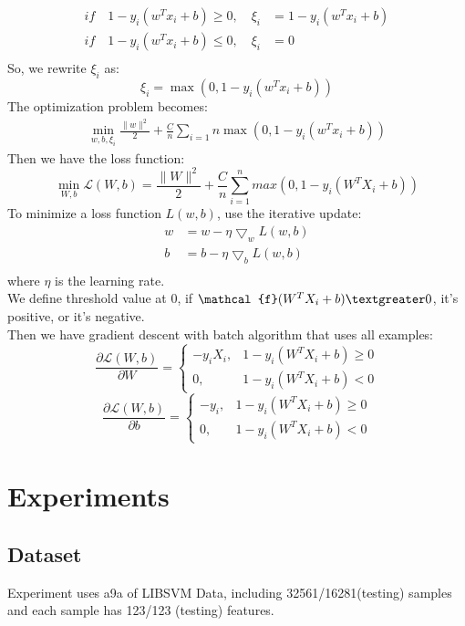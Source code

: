 \documentclass[journal, a4paper]{IEEEtran}
\begin{document}
\begin{equation}
	\begin{aligned}
	\nonumber
		if\quad 1-y_i(w^Tx_i+b)\geq 0, \quad \xi_i &=1-y_i(w^Tx_i+b)\\
		if\quad 1-y_i(w^Tx_i+b)\leq 0, \quad \xi_i &=0\\
	\end{aligned}
\end{equation}
So, we rewrite $\xi_i$ as:\\
$$\xi_i=\max(0,1-y_i(w^Tx_i+b))$$
The optimization problem becomes:
\begin{equation}
	\begin{aligned}
	\nonumber
		\min_{w,b,\xi_i}\frac{\parallel w \parallel^2}{2}+\frac{C}{n}\sum_{i=1}{n}\max{(0,1-y_i(w^Tx_i+b))}
	\end{aligned}
\end{equation}
Then we have the loss function:
$$ \min_{W, b} \mathcal{L}(W, b)= \frac{\parallel W \parallel^2}{2} + \frac{C}{n} \sum_{i=1}^n max(0, 1-y_i(W^T X_i + b))$$
To minimize a loss function $L(w, b)$, use the iterative update:
\begin{equation}
	\begin{aligned}
		w&=w-\eta\bigtriangledown_w L(w, b)\\
		b&=b-\eta\bigtriangledown_b L(w, b)\\
	\end{aligned}
\end{equation}
where $\eta$ is the learning rate.\\
We define threshold value at 0, if $\mathcal{f}(W^T X_i+b) \textgreater 0$, it's positive, or it's negative.\\
Then we have gradient descent with batch algorithm that uses all examples:
$$ \frac{\partial \mathcal{L}(W, b)}{\partial W} = \begin{cases}
-y_i X_i, & 1-y_i(W^T X_i + b) \ge 0 \\
0, &1-y_i(W^T X_i + b) < 0
\end{cases}$$
$$ \frac{\partial \mathcal{L}(W, b)}{\partial b} = \begin{cases}
-y_i, & 1-y_i(W^T X_i + b) \ge 0 \\
0, &1-y_i(W^T X_i + b) < 0
\end{cases}$$


\section{Experiments}
\subsection{Dataset}
Experiment uses a9a of LIBSVM Data, including 32561/16281(testing) samples and each sample has 123/123 (testing) features.
\end{document}
